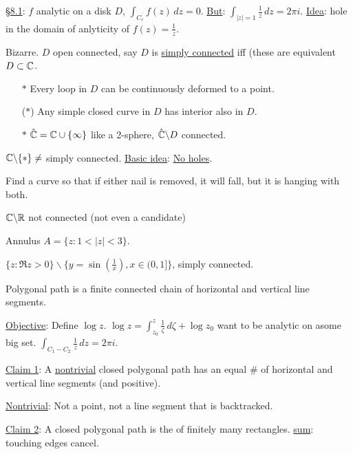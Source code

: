 \documentclass[]{article}
\begin{document}
\underline{\S8.1}: $f$ analytic on a disk $D$, $\int_{C_r} f(z) \, dz = 0$. \underline{But}: $\int_{|z|=1} \frac{1}{z} \, dz = 2\pi i$. \underline{Idea}: hole in the domain of anlyticity of $f(z) = \frac{1}{z}$.
\begin{definition}
	Bizarre. $D$ open connected, say $D$ is \underline{simply connected} iff (these are equivalent $D\subset \mathbb{C}$. 
	\begin{enumerate}
		\item[$*$] Every loop in $D$ can be continuously deformed to a point.
		\item[($*$)] Any simple closed curve in $D$ has interior also in $D$.
		\item[$*$] $\hat{\mathbb{C}} = \mathbb{C} \cup \{\infty\}$ like a 2-sphere, $\hat{\mathbb{C}} \backslash D$ connected.
	\end{enumerate}
	$\mathbb{C}\backslash\{*\} \neq $ simply connected.
	\underline{Basic idea}: \underline{No holes}.
\end{definition}
\begin{remark}
	[Riddle] Find a curve so that if either nail is removed, it will fall, but it is hanging with both.
\end{remark}
\begin{example}
	$\mathbb{C}\backslash \mathbb{R}$ not connected (not even a candidate)
\end{example}
\begin{example}
	Annulus $A = \{z: 1<|z|<3\}$.
\end{example}
\begin{example}
	$\{z:\Re{z}>0\}\backslash \{y = \sin{(\frac{1}{x})}, x\in (0,1]\}$, simply connected.
\end{example}
\begin{recall}
	Polygonal path is a finite connected chain of horizontal and vertical line segments.
\end{recall}
\underline{Objective}: Define $\log{z}$. $\log{z} = \int_{z_0}^z \frac{1}{\zeta} \, d\zeta + \log{z_0}$ want to be analytic on asome big set.
$\int_{C_1-C_2} \frac{1}{z} \, dz = 2\pi i$.

\underline{Claim 1}: A \underline{nontrivial} closed polygonal path has an equal \# of horizontal and vertical line segments (and positive).

\underline{Nontrivial}: Not a point, not a line segment that is backtracked.

\underline{Claim 2}: A closed polygonal path is the \underline{} of finitely many rectangles. \underline{sum}: touching edges cancel.
\end{document}
